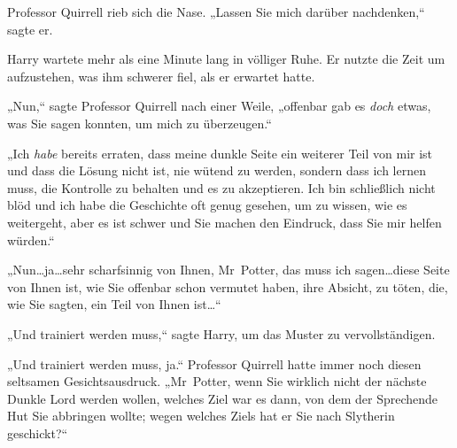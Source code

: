 Professor Quirrell rieb sich die Nase. „Lassen Sie mich darüber nachdenken,“ sagte er.

Harry wartete mehr als eine Minute lang in völliger Ruhe. Er nutzte die Zeit um aufzustehen, was ihm schwerer fiel, als er erwartet hatte.

„Nun,“ sagte Professor Quirrell nach einer Weile, „offenbar gab es \emph{doch} etwas, was Sie sagen konnten, um mich zu überzeugen.“

„Ich \emph{habe} bereits erraten, dass meine dunkle Seite ein weiterer Teil von mir ist und dass die Lösung nicht ist, nie wütend zu werden, sondern dass ich lernen muss, die Kontrolle zu behalten und es zu akzeptieren. Ich bin schließlich nicht blöd und ich habe die Geschichte oft genug gesehen, um zu wissen, wie es weitergeht, aber es ist schwer und Sie machen den Eindruck, dass Sie mir helfen würden.“

„Nun…ja…sehr scharfsinnig von Ihnen, Mr~Potter, das muss ich sagen…diese Seite von Ihnen ist, wie Sie offenbar schon vermutet haben, ihre Absicht, zu töten, die, wie Sie sagten, ein Teil von Ihnen ist…“

„Und trainiert werden muss,“ sagte Harry, um das Muster zu vervollständigen.

„Und trainiert werden muss, ja.“ Professor Quirrell hatte immer noch diesen seltsamen Gesichtsausdruck. „Mr~Potter, wenn Sie wirklich nicht der nächste Dunkle Lord werden wollen, welches Ziel war es dann, von dem der Sprechende Hut Sie abbringen wollte; wegen welches Ziels hat er Sie nach Slytherin geschickt?“

